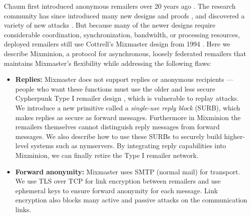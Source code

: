 \documentclass[times,10pt,twocolumn]{article}
\begin{document}
Chaum first introduced anonymous remailers over 20 years ago
\cite{chaum-mix}.
The research community has since introduced many new
designs and proofs
\cite{abe,babel,flash-mix,kesdogan,shuffle,hybrid-mix}, 
and discovered a variety of new attacks 
\cite{back01,langos02,disad-free-routes,desmedt,mitkuro,raymond00}.
But because many of the newer designs require considerable coordination,
synchronization, bandwidth, or processing resources, deployed remailers still use
Cottrell's Mixmaster design from 1994
\cite{mixmaster-attacks,mixmaster-spec}. Here we describe Mixminion, a
protocol for asynchronous, loosely federated remailers that maintains
Mixmaster's flexibility while addressing the following flaws:

\begin{itemize}
\item \textbf{Replies:} Mixmaster does not support replies or anonymous
recipients --- people who want these functions must use the older and less
secure Cypherpunk Type I remailer design \cite{remailer-history}, which is
vulnerable to replay attacks. We introduce a new primitive called a
\emph{single-use reply block} (SURB), which makes replies as secure as
forward messages. Furthermore in Mixminion the remailers
themselves cannot distinguish reply messages from forward messages. We also
describe how to use these SURBs to securely build higher-level systems such as
nymservers. By integrating reply capabilities into Mixminion, we can finally
retire the Type I remailer network.

\item \textbf{Forward anonymity:} Mixmaster uses SMTP (normal mail) for
transport. We use TLS over TCP for link encryption between remailers
and use ephemeral keys to ensure forward anonymity for
each message. Link encryption also blocks many active and
passive attacks on the communication links.



\end{itemize}
\end{document}
